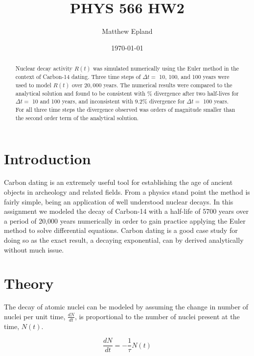 \documentclass[notitlepage,aps,prd,nofootinbib]{revtex4-1}
\begin{document}
\title{PHYS 566 HW2}
\author{Matthew Epland}

\date{\today}

\begin{abstract}
Nuclear decay activity $R\left(t\right)$ was simulated numerically using the Euler method in the context of Carbon-14 dating. Three time steps of $\Delta t =$ 10, 100, and 100 years were used to model $R\left(t\right)$ over $20,000$ years. The numerical results were compared to the analytical solution and found to be consistent with \% divergence after two half-lives for $\Delta t =$ 10 and 100 years, and inconsistent with 9.2\% divergence for $\Delta t =$ 100 years. For all three time steps the divergence observed was orders of magnitude smaller than the second order term of the analytical solution.
\end{abstract}\maketitle


\section{Introduction}
\label{sec:intro}
Carbon dating is an extremely useful tool for establishing the age of ancient objects in archeology and related fields. From a physics stand point the method is fairly simple, being an application of well understood nuclear decays. In this assignment we modeled the decay of Carbon-14 with a half-life of 5700 years over a period of 20,000 years numerically in order to gain practice applying the Euler method to solve differential equations. Carbon dating is a good case study for doing so as the exact result, a decaying exponential, can by derived analytically without much issue.

\section{Theory}
\label{sec:theory}

The decay of atomic nuclei can be modeled by assuming the change in number of nuclei per unit time, $\frac{d N}{d t}$, is proportional to the number of nuclei present at the time, $N\left(t\right)$.

\begin{equation} \label{eq:deq}
\frac{d N}{d t} = -\frac{1}{\tau} N\left(t\right)
\end{equation}
\end{document}
